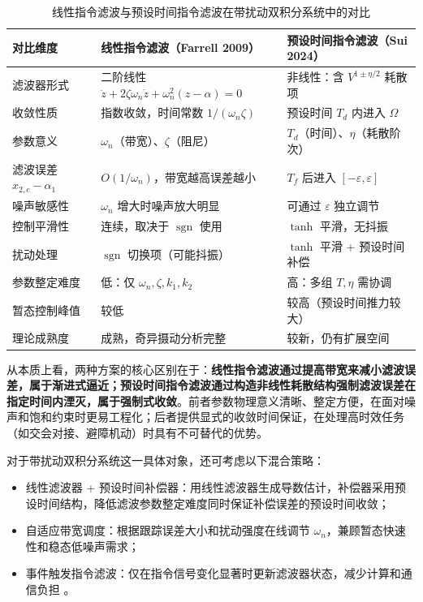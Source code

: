 \documentclass[UTF8,a4paper,11pt]{ctexart}
\begin{document}
\begin{table}[htbp]
\centering
\caption{线性指令滤波与预设时间指令滤波在带扰动双积分系统中的对比}
\begin{tabular}{p{2.8cm}p{5.2cm}p{5.2cm}}
\toprule
对比维度 & 线性指令滤波（Farrell 2009） & 预设时间指令滤波（Sui 2024） \\
\midrule
滤波器形式 & 二阶线性 $\ddot{z} + 2\zeta\omega_n\dot{z} + \omega_n^2(z-\alpha)=0$ & 非线性：含 $V^{1\pm\eta/2}$ 耗散项 \\
收敛性质 & 指数收敛，时间常数 $1/(\omega_n\zeta)$ & 预设时间 $T_d$ 内进入 $\Omega$ \\
参数意义 & $\omega_n$（带宽）、$\zeta$（阻尼） & $T_d$（时间）、$\eta$（耗散阶次） \\
滤波误差 $x_{2,c}-\alpha_1$ & $O(1/\omega_n)$，带宽越高误差越小 & $T_f$ 后进入 $[-\varepsilon,\varepsilon]$ \\
噪声敏感性 & $\omega_n$ 增大时噪声放大明显 & 可通过 $\varepsilon$ 独立调节 \\
控制平滑性 & 连续，取决于 $\operatorname{sgn}$ 使用 & $\tanh$ 平滑，无抖振 \\
扰动处理 & $\operatorname{sgn}$ 切换项（可能抖振） & $\tanh$ 平滑 + 预设时间补偿 \\
参数整定难度 & 低：仅 $\omega_n, \zeta, k_1, k_2$ & 高：多组 $T, \eta$ 需协调 \\
暂态控制峰值 & 较低 & 较高（预设时间推力较大） \\
理论成熟度 & 成熟，奇异摄动分析完整 & 较新，仍有扩展空间 \\
\bottomrule
\end{tabular}
\end{table}

从本质上看，两种方案的核心区别在于：\textbf{线性指令滤波通过提高带宽来减小滤波误差，属于渐进式逼近；预设时间指令滤波通过构造非线性耗散结构强制滤波误差在指定时间内湮灭，属于强制式收敛}。前者参数物理意义清晰、整定方便，在面对噪声和饱和约束时更易工程化；后者提供显式的收敛时间保证，在处理高时效任务（如交会对接、避障机动）时具有不可替代的优势。

对于带扰动双积分系统这一具体对象，还可考虑以下混合策略：
\begin{itemize}
  \item 线性滤波器 + 预设时间补偿器：用线性滤波器生成导数估计，补偿器采用预设时间结构，降低滤波参数整定难度同时保证补偿误差的预设时间收敛；
  \item 自适应带宽调度：根据跟踪误差大小和扰动强度在线调节 $\omega_n$，兼顾暂态快速性和稳态低噪声需求；
  \item 事件触发指令滤波：仅在指令信号变化显著时更新滤波器状态，减少计算和通信负担 \cite{Liu2026USV}。
\end{itemize}
\end{document}
